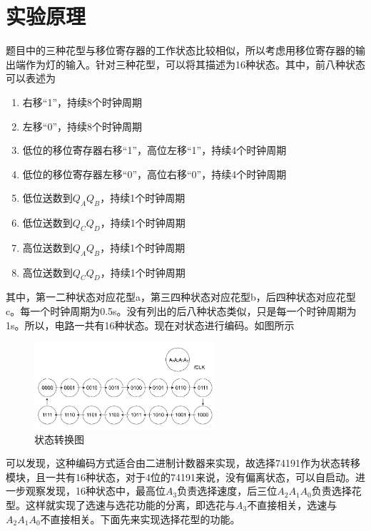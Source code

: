 \documentclass{ctexart}
\begin{document}
\section{实验原理}
题目中的三种花型与移位寄存器的工作状态比较相似，所以考虑用移位寄存器的输出端作为灯的输入。针对三种花型，可以将其描述为16种状态。其中，前八种状态可以表述为
\begin{enumerate}
    \item 右移“1”，持续8个时钟周期
    \item 左移“0”，持续8个时钟周期
    \item 低位的移位寄存器右移“1”，高位左移“1”，持续4个时钟周期
    \item 低位的移位寄存器左移“0”，高位右移“0”，持续4个时钟周期
    \item 低位送数到$Q_A Q_B$，持续1个时钟周期
    \item 低位送数到$Q_C Q_D$，持续1个时钟周期
    \item 高位送数到$Q_A Q_B$，持续1个时钟周期
    \item 高位送数到$Q_C Q_D$，持续1个时钟周期
\end{enumerate}
其中，第一二种状态对应花型a，第三四种状态对应花型b，后四种状态对应花型c。每一个时钟周期为0.5s。没有列出的后八种状态类似，只是每一个时钟周期为1s。所以，电路一共有16种状态。现在对状态进行编码。如图所示
\begin{figure}[H]
    \centering
    \includegraphics[width=0.6\textwidth]{状态转换图.png}
    \caption{状态转换图}
\end{figure}
可以发现，这种编码方式适合由二进制计数器来实现，故选择74191作为状态转移模块，且一共有16种状态，对于4位的74191来说，没有偏离状态，可以自启动。进一步观察发现，16种状态中，最高位$A_3$负责选择速度，后三位$A_2 A_1 A_0$负责选择花型。这样就实现了选速与选花功能的分离，即选花与$A_3$不直接相关，选速与$A_2 A_1 A_0$不直接相关。下面先来实现选择花型的功能。
\end{document}
